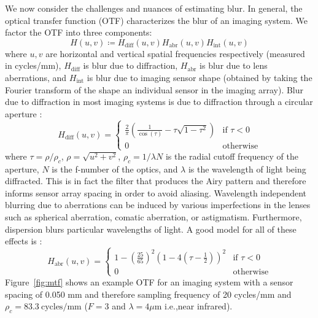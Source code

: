We now consider the challenges and nuances of estimating blur.
%
In general, the optical transfer function (OTF) characterizes the blur of an imaging system.
%
We factor the OTF into three components:
\begin{equation}
	H(u, v) \coloneqq H_{\text{diff}}(u,v) H_{\text{abr}}(u,v) H_{\text{int}} (u,v)
\end{equation}
where \(u,v\) are horizontal and vertical spatial frequencies respectively (measured in cycles/mm), \(H_{\text{diff}}\) is blur due to diffraction, \(H_{\text{abr}}\) is blur due to lens aberrations, and \(H_{\text{int}}\) is blur due to imaging sensor shape (obtained by taking the Fourier transform of the shape an individual sensor in the imaging array).
%
Blur due to diffraction in most imaging systems is due to diffraction through a circular aperture \cite{goodman2005introduction}:
\begin{equation*}
	H_{\text{diff}}(u,v) =   \begin{cases}
		\frac{2}{\pi} \left(\frac{1}{\cos(\tau)} - \tau \sqrt{1-\tau^2}\right) & \text{if } \tau < 0 \\
		0                                                                      & \text{otherwise}
	\end{cases}
\end{equation*}
where \(\tau = \rho/\rho_c\), \(\rho=\sqrt{u^2 +v^2}\), \(\rho_c = 1/\lambda N\) is the radial cutoff frequency of the aperture, \(N\) is the f-number of the optics, and \(\lambda\) is the wavelength of light being diffracted.
%
This is in fact the filter that produces the Airy pattern and therefore informs sensor array spacing in order to avoid aliasing.
%
Wavelength independent blurring due to aberrations can be induced by various imperfections in the lenses such as spherical aberration, comatic aberration, or astigmatism. Furthermore, dispersion blurs particular wavelengths of light. A good model for all of these effects is \cite{10.1117.12.946501}:
\begin{equation*}
	H_{\text{abr}}(u,v) =   \begin{cases}
		1-\left(\frac{25}{65}\right)^2 \left(1-4\left(\tau - \frac{1}{2}\right)\right)^2 & \text{if } \tau < 0 \\
		0                                                                                & \text{otherwise}
	\end{cases}
\end{equation*}
Figure~\ref{fig:mtf} shows an example OTF for an imaging system with a sensor spacing of 0.050 mm and therefore sampling frequency of 20 cycles/mm and \(\rho_c = 83.3~\text{cycles}/\text{mm}\) (\(F=3\) and \(\lambda = 4\mu\text{m}\) i.e.,near infrared).
